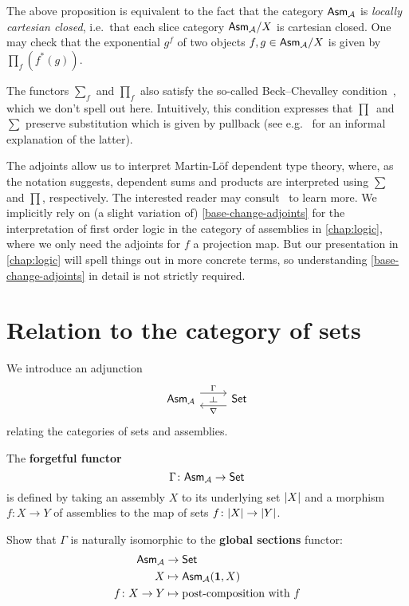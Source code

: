 The above proposition is equivalent to the fact that the category \(\mathsf{Asm}_{\mathcal A}\)
is \emph{locally cartesian closed}, i.e.\ that each slice category
\(\mathsf{Asm}_{\mathcal A}/X\) is cartesian closed.
%
One may check that the exponential \(g^f\) of two objects
\(f,g \in \mathsf{Asm}_{\mathcal A}/X\) is given by \(\prod_f(f^\ast(g))\).

The functors \(\sum_f\) and \(\prod_f\) also satisfy the so-called
Beck--Chevalley condition~\cite[Theorem~4.4]{Streicher2018}, which we don't
spell out here. Intuitively, this condition expresses that
\(\prod\)~and~\(\sum\) preserve substitution which is given by pullback (see
e.g.~\cite{Bauer2012} for an informal explanation of the latter).

The adjoints allow us to interpret Martin-L\"of dependent type theory, where, as
the notation suggests, dependent sums and products are interpreted using
\(\sum\) and \(\prod\), respectively. The interested reader may
consult~\cite{Seely1984,Jacobs1999,Streicher1991} to learn more.
%
We implicitly rely on (a slight variation of) \cref{base-change-adjoints} for
the interpretation of first order logic in the category of assemblies in
\cref{chap:logic}, where we only need the adjoints for \(f\) a projection
map.
%
But our presentation in \cref{chap:logic} will spell things out in more concrete
terms, so understanding \cref{base-change-adjoints} in detail is not strictly
required.

\section{Relation to the category of sets}\label{sec:relation-to-Set}

We introduce an adjunction
\[
\begin{tikzcd}
\mathbb{\Asm{\AA}}
\arrow[r, "\Gamma"{name=F}, shift left=2mm] &
\mathbb{\Set}
\arrow[l, "\nabla"{name=G}, shift left=2mm]
\arrow[phantom, from=F, to=G, "\dashv" rotate=-90]
\end{tikzcd}
\]
relating the categories of sets and assemblies.

\begin{definition}
  The \textbf{forgetful functor}
  \[
    \Gamma \colon \mathsf{Asm}_{\mathcal A} \to \mathsf{Set}
  \]
  is defined by taking an assembly \(X\) to its underlying set \(\lvert X\rvert\)
  and a morphism \(f \colon X \to Y\) of assemblies to the map of sets
  \(f \colon \lvert X\rvert \to \lvert Y\rvert\).
\end{definition}

\begin{exercise}\label{exer:Gamma-global-sections}
  Show that \(\Gamma\) is naturally isomorphic to the \textbf{global sections}
  functor:
  \begin{align*}
    \mathsf{Asm}_{\mathcal A} &\to \mathsf{Set} \\
    X &\mapsto \mathsf{Asm}_{\mathcal A}(\mathbf 1,X) \\
    f \colon X \to Y &\mapsto \text{post-composition with \(f\)}
  \end{align*}
\end{exercise}

